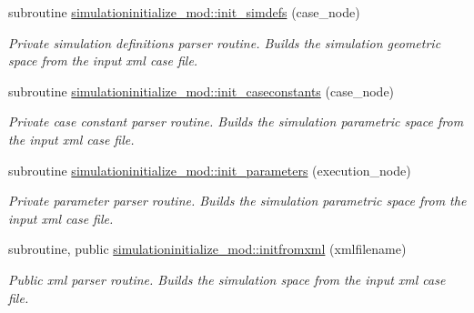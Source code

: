 \begin{DoxyCompactItemize}
subroutine \mbox{\hyperlink{namespacesimulationinitialize__mod_af6b2508d52e9e29aeb6e7dfbabd88e8d}{simulationinitialize\+\_\+mod\+::init\+\_\+simdefs}} (case\+\_\+node)
\begin{DoxyCompactList}\small\item\em Private simulation definitions parser routine. Builds the simulation geometric space from the input xml case file. \end{DoxyCompactList}\item 
subroutine \mbox{\hyperlink{namespacesimulationinitialize__mod_ae41256ca5e72ebf27660ffdfe5c08e46}{simulationinitialize\+\_\+mod\+::init\+\_\+caseconstants}} (case\+\_\+node)
\begin{DoxyCompactList}\small\item\em Private case constant parser routine. Builds the simulation parametric space from the input xml case file. \end{DoxyCompactList}\item 
subroutine \mbox{\hyperlink{namespacesimulationinitialize__mod_a0b32e8c950fc615198d1e47ba1d36cd6}{simulationinitialize\+\_\+mod\+::init\+\_\+parameters}} (execution\+\_\+node)
\begin{DoxyCompactList}\small\item\em Private parameter parser routine. Builds the simulation parametric space from the input xml case file. \end{DoxyCompactList}\item 
subroutine, public \mbox{\hyperlink{namespacesimulationinitialize__mod_ada0310fe0d45fa2eec30deaf3ad25ba7}{simulationinitialize\+\_\+mod\+::initfromxml}} (xmlfilename)
\begin{DoxyCompactList}\small\item\em Public xml parser routine. Builds the simulation space from the input xml case file. \end{DoxyCompactList}\end{DoxyCompactItemize}

